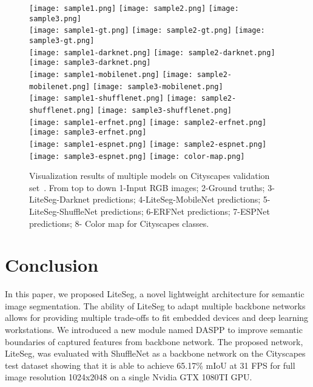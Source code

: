 \documentclass[conference,a4paper]{IEEEtran}
\begin{document}
\begin{figure*}[t]
\begin{center}
    \texttt{[image: sample1.png]}
    \texttt{[image: sample2.png]}
    \texttt{[image: sample3.png]}
    \\

    \texttt{[image: sample1-gt.png]}
    \texttt{[image: sample2-gt.png]}
    \texttt{[image: sample3-gt.png]}
    \\

    \texttt{[image: sample1-darknet.png]}
    \texttt{[image: sample2-darknet.png]}
    \texttt{[image: sample3-darknet.png]}
    \\

    \texttt{[image: sample1-mobilenet.png]}
    \texttt{[image: sample2-mobilenet.png]}
    \texttt{[image: sample3-mobilenet.png]}
    \\

    \texttt{[image: sample1-shufflenet.png]}
    \texttt{[image: sample2-shufflenet.png]}
    \texttt{[image: sample3-shufflenet.png]}
     \\

    \texttt{[image: sample1-erfnet.png]}
    \texttt{[image: sample2-erfnet.png]}
    \texttt{[image: sample3-erfnet.png]}
    \\

    \texttt{[image: sample1-espnet.png]}
    \texttt{[image: sample2-espnet.png]}
    \texttt{[image: sample3-espnet.png]}  
    \texttt{[image: color-map.png]} 
\end{center}
\caption{Visualization results of multiple models on Cityscapes validation set~\cite{dataset}. From top to down 1-Input RGB images; 2-Ground truths; 3-LiteSeg-Darknet predictions; 4-LiteSeg-MobileNet predictions; 5-LiteSeg-ShuffleNet predictions; 6-ERFNet predictions; 7-ESPNet predictions; 8- Color map for Cityscapes classes.}
\label{fig:results-cityscapes-viz}
\end{figure*}

\section{Conclusion}
In this paper, we proposed LiteSeg, a novel lightweight architecture for semantic image segmentation. The ability of LiteSeg to adapt multiple backbone networks allows for providing multiple trade-offs to fit embedded devices and deep learning workstations. We introduced a new module named DASPP to improve semantic boundaries of captured features from backbone network. The proposed network, LiteSeg, was evaluated with ShuffleNet as a backbone network on the Cityscapes test dataset showing that it is able to achieve 65.17\% mIoU at 31 FPS for full image resolution 1024x2048 on a single Nvidia GTX 1080TI GPU.

\clearpage



\end{document}
